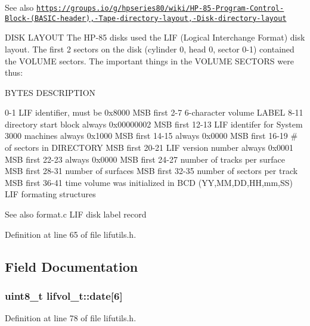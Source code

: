 \begin{DoxySeeAlso}{See also}
\href{https://groups.io/g/hpseries80/wiki/HP-85-Program-Control-Block-(BASIC-header),-Tape-directory-layout,-Disk-directory-layout}{\tt https\+://groups.\+io/g/hpseries80/wiki/\+H\+P-\/85-\/\+Program-\/\+Control-\/\+Block-\/(\+B\+A\+S\+I\+C-\/header),-\/\+Tape-\/directory-\/layout,-\/\+Disk-\/directory-\/layout}
\end{DoxySeeAlso}
D\+I\+SK L\+A\+Y\+O\+UT The H\+P-\/85 disks used the L\+IF (Logical Interchange Format) disk layout. The first 2 sectors on the disk (cylinder 0, head 0, sector 0-\/1) contained the V\+O\+L\+U\+ME sectors. The important things in the V\+O\+L\+U\+ME S\+E\+C\+T\+O\+RS were thus\+:

B\+Y\+T\+ES D\+E\+S\+C\+R\+I\+P\+T\+I\+ON 

 0-\/1 L\+IF identifier, must be 0x8000 M\+SB first 2-\/7 6-\/character volume L\+A\+B\+EL 8-\/11 directory start block always 0x00000002 M\+SB first 12-\/13 L\+IF identifer for System 3000 machines always 0x1000 M\+SB first 14-\/15 always 0x0000 M\+SB first 16-\/19 \# of sectors in D\+I\+R\+E\+C\+T\+O\+RY M\+SB first 20-\/21 L\+IF version number always 0x0001 M\+SB first 22-\/23 always 0x0000 M\+SB first 24-\/27 number of tracks per surface M\+SB first 28-\/31 number of surfaces M\+SB first 32-\/35 number of sectors per track M\+SB first 36-\/41 time volume was initialized in B\+CD (YY,MM,DD,HH,mm,SS) L\+IF formating structures \begin{DoxySeeAlso}{See also}
format.\+c L\+IF disk label record 
\end{DoxySeeAlso}


Definition at line 65 of file lifutils.\+h.



\subsection{Field Documentation}
\subsubsection[{\texorpdfstring{date}{date}}]{\setlength{\rightskip}{0pt plus 5cm}uint8\+\_\+t lifvol\+\_\+t\+::date\mbox{[}6\mbox{]}}\hypertarget{structlifvol__t_a41f630e7211326270dc6e72a55f94516}{}\label{structlifvol__t_a41f630e7211326270dc6e72a55f94516}


Definition at line 78 of file lifutils.\+h.



